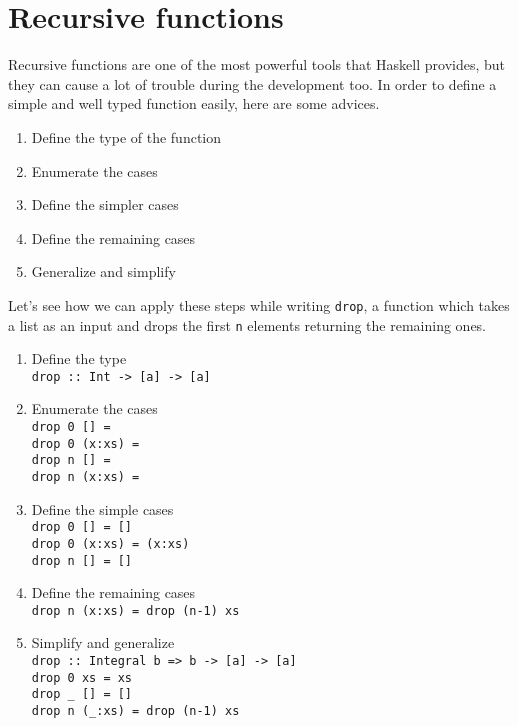 \section{Recursive functions}
Recursive functions are one of the most powerful tools that Haskell provides, but they can cause a lot of trouble during the development too. In order to define a simple and well typed function easily, here are some advices.

\begin{enumerate}
	\item Define the type of the function
	\item Enumerate the cases
	\item Define the simpler cases
	\item Define the remaining cases
	\item Generalize and simplify 
\end{enumerate}

Let's see how we can apply these steps while writing \texttt{drop}, a function which takes a list as an input and drops the first \texttt{n} elements returning the remaining ones. 

\begin{enumerate}
	\item Define the type\\
		  \texttt{drop :: Int -> [a] -> [a]}
	
	\item Enumerate the cases \\
		  \texttt{drop 0 [] = } \\
		  \texttt{drop 0 (x:xs) = } \\
		  \texttt{drop n [] =}  \\
		  \texttt{drop n (x:xs) = }
		  
	\item Define the simple cases \\
		  \texttt{drop 0 [] = []} \\
		  \texttt{drop 0 (x:xs) = (x:xs)} \\
		  \texttt{drop n [] = []}
		  
	\item Define the remaining cases \\
		  \texttt{drop n (x:xs) = drop (n-1) xs}
		  
	\item Simplify and generalize \\
		  \texttt{drop :: Integral b => b -> [a] -> [a]} \\
		  \texttt{drop 0 xs = xs} \\
		  \texttt{drop \_ [] = []} \\
		  \texttt{drop n (\_:xs) = drop (n-1) xs}
	
\end{enumerate}


